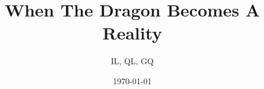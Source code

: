 
\usepackage{palatino}    %
\usepackage{amsthm}      %
    \newtheorem{thm}{Theorem}[section]
    \newtheorem{cor}{Corollary}[section]
    \newtheorem{defn}{Definition}%
\usepackage{hyperref}    %
\usepackage[all]{xy}
\usepackage{subfigure}




\def\abstractname{Abstract}
\def\sheetsummaryname{Summary}
\newcommand{\emphb}[1]{\textbf{#1}}
\newcommand{\emphi}[1]{\textit{#1}}
\setcounter{tocdepth}{2}

\title{When The Dragon Becomes A Reality}
\author{IL, QL, GQ}
\date{\today}